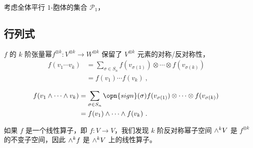考虑全体平行 $1$-胞体的集合 $\mathcal{P}_1$，

\subsection{行列式}

$f$ 的 $k$ 阶张量幂$f^{\otimes k}: V^{\otimes k} \to W^{\otimes k}$ 保留了 $V^{\otimes k}$ 元素的对称/反对称性，
\begin{equation}
\begin{aligned}
f(v_1 \cdots v_k) &= \sum_{\sigma \in S_n} f(v_{\sigma(1)}) \otimes \cdots \otimes f(v_{\sigma(k)}) \\
&= f(v_1) \cdots f(v_k)~,
\end{aligned}~
\end{equation}

\begin{equation}
\begin{aligned}
f(v_1 \wedge \cdots \wedge v_k) &= \sum_{\sigma \in S_n} \opn{sign}(\sigma) f(v_{\sigma(1)}) \otimes \cdots \otimes f(v_{\sigma(k)}) \\
&= f(v_1) \wedge \cdots \wedge f(v_k)~.
\end{aligned}~
\end{equation}


如果 $f$ 是一个线性算子，即 $f: V \to V$，我们发现 $k$ 阶反对称幂子空间 ${\large \wedge}^k V$ 是 $f^{\otimes k}$ 的不变子空间，因此 ${\large \wedge}^k f$ 是 ${\large \wedge}^k V$ 上的线性算子。



